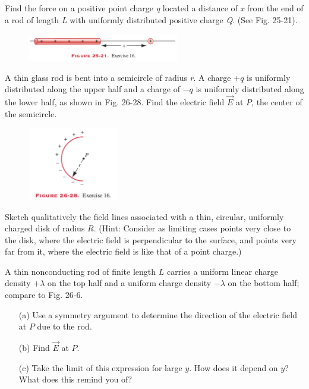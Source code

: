 \documentclass[11pt,letterpaper,boxed]{pset}
\begin{document}
    \begin{problem} [*E25.16]
    	Find the force on a positive point charge \textit{q} located a distance of \textit{x} from the end of a rod of length \textit{L} with uniformly distributed positive charge \textit{Q}. (See Fig. 25-21).
    \end{problem}
    
    \begin{figure} [ht]
        \includegraphics[width=250px]{HW1Images/E25-16.png}
        \label{fig:E25-16}
    \end{figure}
    \newpage
    
    \begin{problem} [E26.16]
    	A thin glass rod is bent into a semicircle of radius \textit{r}. A charge $+q$ is uniformly distributed along the upper half and a charge of $-q$ is uniformly distributed along the lower half, as shown in Fig. 26-28. Find the electric field \textbf{$\Vec{E}$} at $P$, the center of the semicircle.
    \end{problem}
    
    \begin{figure} [ht]
        \includegraphics[width=150px]{HW1Images/E26-16.png}
        \label{fig:E26-16}
    \end{figure}
    \newpage
    
    \begin{problem} [E26.21]
    	Sketch qualitatively the field lines associated with a thin, circular, uniformly charged disk of radius $R$. (Hint: Consider as limiting cases points very close to the disk, where the electric field is perpendicular to the surface, and points very far from it, where the electric field is like that of a point charge.)
    \end{problem}
    \newpage
    
    \begin{problem} [P26.7]
    	A thin nonconducting rod of finite length $L$ carries a uniform linear charge density $+\lambda$ on the top half and a uniform charge density $-\lambda$ on the bottom half; compare to Fig. 26-6.
    	
    	\begin{itemize}
    	    \item [(a)] Use a symmetry argument to determine the direction of the electric field at $P$ due to the rod.
    	    \item [(b)] Find \textbf{$\Vec{E}$} at $P$.
    	    \item [(c)] Take the limit of this expression for large $y$. How does it depend on $y$? What does this remind you of?
    	\end{itemize}
    \end{problem}
    
\end{document}
